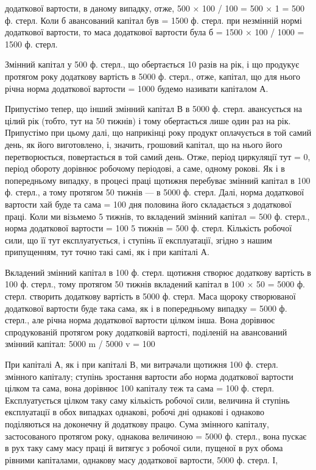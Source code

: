 додаткової вартости, в даному випадку, отже, 500 × 100 / 100 = 500 × 1 = 500 ф. стерл. Коли б
авансований капітал був = 1500 ф. стерл. при незмінній
нормі додаткової вартости, то маса додаткової вартости була б =
1500 × 100 / 1000 = 1500 ф. стерл.

Змінний капітал у 500 ф. стерл., що обертається 10 разів на рік, і
що продукує протягом року додаткову вартість в 5000 ф. стерл., отже,
капітал, що для нього річна норма додаткової вартости = 1000%
будемо називати капіталом А.

Припустімо тепер, що інший змінний капітал В в 5000 ф. стерл.
авансується на цілий рік (тобто, тут на 50 тижнів) і тому обертається
лише один раз на рік. Припустімо при цьому далі, що наприкінці року
продукт оплачується в той самий день, як його виготовлено, і, значить,
грошовий капітал, що на нього його перетворюється, повертається в той
самий день. Отже, період циркуляції тут = 0, період обороту дорівнює
робочому періодові, а саме, одному рокові. Як і в попередньому випадку,
в процесі праці щотижня перебуває змінний капітал в 100 ф. стерл.,
а тому протягом 50 тижнів — в 5000 ф. стерл. Далі, норма додаткової
вартости хай буде та сама = 100%
дня половина його складається з додаткової праці. Коли ми візьмемо
5 тижнів, то вкладений змінний капітал = 500 ф. стерл., норма додаткової
вартости = 100%
5 тижнів = 500 ф. стерл. Кількість робочої сили, що її тут експлуатується,
і ступінь її експлуатації, згідно з нашим припущенням, тут
точно такі самі, як і при капіталі А.

Вкладений змінний капітал в 100 ф. стерл. щотижня створює додаткову
вартість в 100 ф. стерл., тому протягом 50 тижнів вкладений капітал
в 100 × 50 = 5000 ф. стерл. створить додаткову вартість в 5000 ф. стерл. Маса щороку створюваної
додаткової вартости буде така сама, як і в попередньому випадку = 5000 ф. стерл., але річна норма
додаткової
вартости цілком інша. Вона дорівнює спродукованій протягом року
додатковій вартості, поділеній на авансований змінний капітал:
5000 m / 5000 v = 100%

При капіталі А, як і при капіталі В, ми витрачали щотижня 100 ф. стерл. змінного капіталу; ступінь
зростання вартости або норма додаткової
вартости цілком та сама, вона дорівнює 100%
капіталу теж та сама = 100 ф. стерл. Експлуатується цілком таку
саму кількість робочої сили, величина й ступінь експлуатації в обох випадках
однакові, робочі дні однакові і однаково поділяються на доконечну
й додаткову працю. Сума змінного капіталу, застосованого протягом
року, однакова величиною = 5000 ф. стерл., вона пускає в рух таку
саму масу праці й витягує з робочої сили, пущеної в рух обома рівними
капіталами, однакову масу додаткової вартости, 5000 ф. стерл. І,
